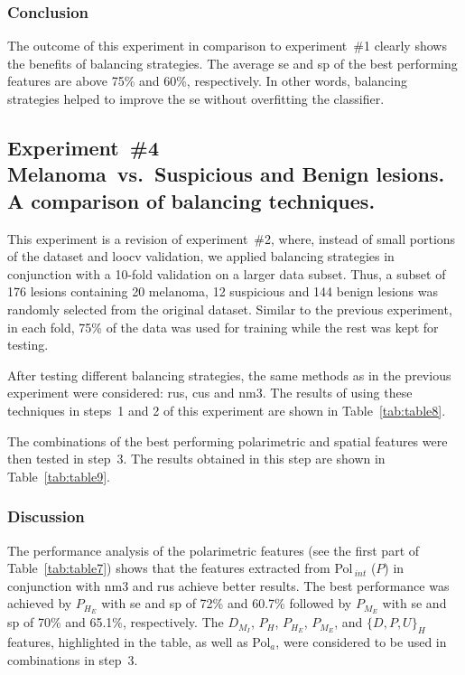 \subsubsection{Conclusion}
The outcome of this experiment in comparison to experiment~\#1 clearly shows the benefits of balancing strategies.
The average \ac{se} and \ac{sp} of the best performing features are above 75\% and 60\%, respectively.
In other words, balancing strategies helped to improve the \ac{se} without overfitting the classifier. 


\subsection{Experiment~\#4\\
\small{Melanoma~vs.~Suspicious and Benign lesions. A comparison of balancing techniques.}}
This experiment is a revision of experiment~\#2, where, instead of small portions of the dataset and \ac{loocv} validation, we applied balancing strategies in conjunction with a 10-fold validation on a larger data subset.
Thus, a subset of 176 lesions containing 20 melanoma, 12 suspicious and 144 benign lesions was randomly selected from the original dataset.
Similar to the previous experiment, in each fold, 75\% of the data was used for training while the rest was kept for testing.

After testing different balancing strategies, the same methods as in the previous experiment were considered: \ac{rus}, \ac{cus} and \ac{nm3}.
The results of using these techniques in steps~1 and 2 of this experiment are shown in Table~\ref{tab:table8}.

The combinations of the best performing polarimetric and spatial features were then tested in step~3.
The results obtained in this step are shown in Table~\ref{tab:table9}.


\subsubsection{Discussion}
The performance analysis of the polarimetric features (see the first part of Table~\ref{tab:table7}) shows that the features extracted from Pol$_{~int}$ ($P$) in conjunction with \ac{nm3} and \ac{rus} achieve better results. 
The best performance was achieved by $P_{H_{E}}$ with \ac{se} and \ac{sp} of 72\% and 60.7\% followed by $P_{M_{E}}$ with \ac{se} and \ac{sp} of 70\% and 65.1\%, respectively.
The $D_{M_{I}}$, $P_{H}$, $P_{H_{E}}$, $P_{M_{E}}$, and $\{D,P,U\}_{H}$ features, highlighted in the table, as well as Pol$_{a}$, were considered to be used in combinations in step~3.

